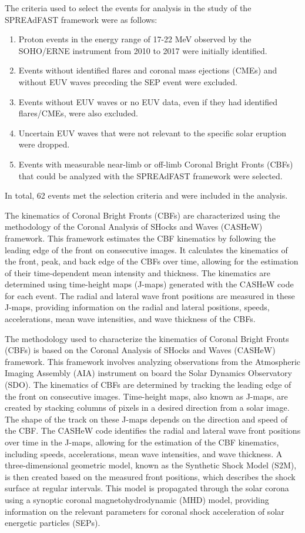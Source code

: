 The criteria used to select the events for analysis in the study of the SPREAdFAST framework were as follows:
\begin{enumerate}
    \item Proton events in the energy range of 17-22 MeV observed by the SOHO/ERNE instrument from 2010 to 2017 were initially identified.
    \item Events without identified flares and coronal mass ejections (CMEs) and without EUV waves preceding the SEP event were excluded.
    \item Events without EUV waves or no EUV data, even if they had identified flares/CMEs, were also excluded.
    \item Uncertain EUV waves that were not relevant to the specific solar eruption were dropped.
    \item Events with measurable near-limb or off-limb Coronal Bright Fronts (CBFs) that could be analyzed with the SPREAdFAST framework were selected.
\end{enumerate}
In total, 62 events met the selection criteria and were included in the analysis.

The kinematics of Coronal Bright Fronts (CBFs) are characterized using the methodology of the Coronal Analysis of SHocks and Waves (CASHeW) framework. This framework estimates the CBF kinematics by following the leading edge of the front on consecutive images. It calculates the kinematics of the front, peak, and back edge of the CBFs over time, allowing for the estimation of their time-dependent mean intensity and thickness. The kinematics are determined using time-height maps (J-maps) generated with the CASHeW code for each event. The radial and lateral wave front positions are measured in these J-maps, providing information on the radial and lateral positions, speeds, accelerations, mean wave intensities, and wave thickness of the CBFs.

The methodology used to characterize the kinematics of Coronal Bright Fronts (CBFs) is based on the Coronal Analysis of SHocks and Waves (CASHeW) framework. This framework involves analyzing observations from the Atmospheric Imaging Assembly (AIA) instrument on board the Solar Dynamics Observatory (SDO). The kinematics of CBFs are determined by tracking the leading edge of the front on consecutive images. Time-height maps, also known as J-maps, are created by stacking columns of pixels in a desired direction from a solar image. The shape of the track on these J-maps depends on the direction and speed of the CBF. The CASHeW code identifies the radial and lateral wave front positions over time in the J-maps, allowing for the estimation of the CBF kinematics, including speeds, accelerations, mean wave intensities, and wave thickness. A three-dimensional geometric model, known as the Synthetic Shock Model (S2M), is then created based on the measured front positions, which describes the shock surface at regular intervals. This model is propagated through the solar corona using a synoptic coronal magnetohydrodynamic (MHD) model, providing information on the relevant parameters for coronal shock acceleration of solar energetic particles (SEPs).

